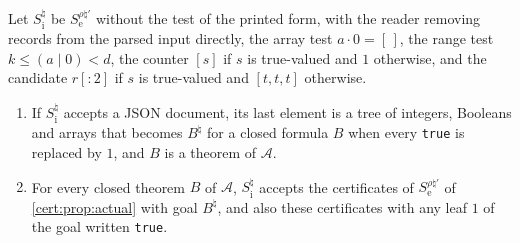 \begin{proposition}\label{cert:prop:intrinsic}
Let $S^{\natural}_{\mathrm i}$ be $S^{\rho\natural\prime}_{\mathrm e}$ without the test of
the printed form, with the reader removing records from the parsed input directly, the
array test $a\cdot 0=[\,]$, the range test $k\le(a\mathbin{|}0)<d$, the counter
$[s]$ if $s$ is true-valued and $1$ otherwise, and the candidate $r[{:}2]$ if $s$ is
true-valued and $[t,t,t]$ otherwise.
\begin{enumerate}[label=(\alph*)]
\item If $S^{\natural}_{\mathrm i}$ accepts a JSON document, its last element is a tree of
integers, Booleans and arrays that becomes $B^{\natural}$ for a closed formula $B$ when
every \texttt{true} is replaced by $1$, and $B$ is a theorem of $\mathcal A$.
\item For every closed theorem $B$ of $\mathcal A$, $S^{\natural}_{\mathrm i}$ accepts the
certificates of $S^{\rho\natural\prime}_{\mathrm e}$ of \cref{cert:prop:actual} with goal
$B^{\natural}$, and also these certificates with any leaf $1$ of the goal written
\texttt{true}.
\end{enumerate}
\end{proposition}
